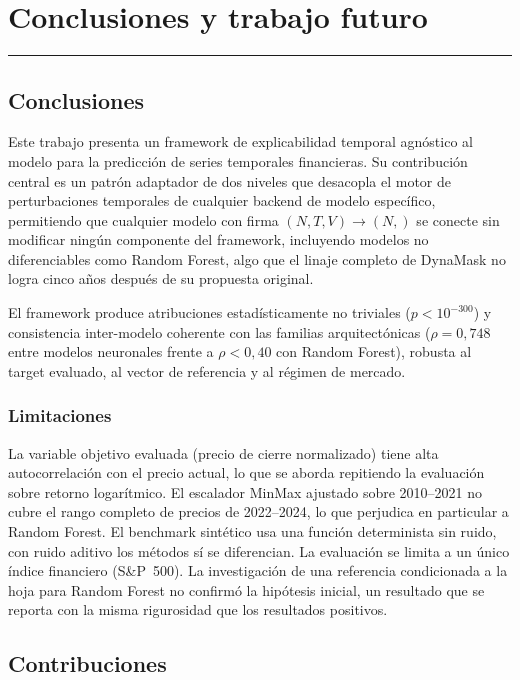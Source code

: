 \chapter{Conclusiones y trabajo futuro}
\hrule \bigskip \vspace*{1cm}

\section{Conclusiones}

Este trabajo presenta un framework de explicabilidad temporal agnóstico al modelo para la predicción de series temporales financieras. Su contribución central es un patrón adaptador de dos niveles que desacopla el motor de perturbaciones temporales de cualquier backend de modelo específico, permitiendo que cualquier modelo con firma $(N,T,V) \rightarrow (N,)$ se conecte sin modificar ningún componente del framework, incluyendo modelos no diferenciables como Random Forest, algo que el linaje completo de DynaMask no logra cinco años después de su propuesta original.

El framework produce atribuciones estadísticamente no triviales ($p<10^{-300}$) y consistencia inter-modelo coherente con las familias arquitectónicas ($\rho=0{,}748$ entre modelos neuronales frente a $\rho<0{,}40$ con Random Forest), robusta al target evaluado, al vector de referencia y al régimen de mercado.

\subsection{Limitaciones}

La variable objetivo evaluada (precio de cierre normalizado) tiene alta autocorrelación con el precio actual, lo que se aborda repitiendo la evaluación sobre retorno logarítmico. El escalador MinMax ajustado sobre 2010--2021 no cubre el rango completo de precios de 2022--2024, lo que perjudica en particular a Random Forest. El benchmark sintético usa una función determinista sin ruido, con ruido aditivo los métodos sí se diferencian. La evaluación se limita a un único índice financiero (S\&P~500). La investigación de una referencia condicionada a la hoja para Random Forest no confirmó la hipótesis inicial, un resultado que se reporta con la misma rigurosidad que los resultados positivos.

\section{Contribuciones}

